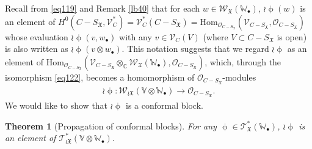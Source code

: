 \documentclass[12pt,a4paper,notitlepage]{report}
\theoremstyle{definition}
\theoremstyle{plain}
\newtheorem{thm}[df]{Theorem}
\newcommand{\fk}{\mathfrak}
\newcommand{\Hom}{\mathrm{Hom}}
\newcommand{\scr}{\mathscr}
\newcommand{\blt}{\bullet}
\newcommand{\Vbb}{\mathbb V}
\newcommand{\Wbb}{\mathbb W}
\newcommand{\Cbb}{\mathbb C}
\numberwithin{equation}{section}
\begin{document}
Recall from \eqref{eq119} and Remark \ref{lb40} that for each $w\in\scr W_{\fk X}(\Wbb_\blt)$, $\wr\upphi(w)$ is an element of $H^0(C-S_{\fk X},\scr V_C^*)=\scr V_C^*(C-S_{\fk X})=\Hom_{\scr O_{C-S_{\fk X}}}(\scr V_{C-S_{\fk X}},\scr O_{C-S_{\fk X}})$ whose evaluation $\wr\upphi(v,w_\blt)$ with any $v\in\scr V_C(V)$ (where $V\subset C-S_{\fk X}$ is open) is also written as $\wr\upphi(v\otimes w_\blt)$. This notation suggests that we regard $\wr\upphi$ as an element of $\Hom_{\scr O_{C-S_{\fk X}}}(\scr V_{C-S_{\fk X}}\otimes_\Cbb\scr W_{\fk X}(\Wbb_\blt),\scr O_{C-S_{\fk X}})$, which, through the isomorphism \eqref{eq122}, becomes a homomorphism of $\scr O_{C-S_{\fk X}}$-modules 
\begin{align*}
\wr\upphi:\scr W_{\wr\fk X}(\Vbb\otimes\Wbb_\blt)\rightarrow\scr O_{C-S_{\fk X}}.
\end{align*}
We would like to show that $\wr\upphi$ is a conformal block.



\begin{thm}[Propagation of conformal blocks]\label{lb126}
For any $\upphi\in\scr T_{\fk X}^*(\Wbb_\blt)$, $\wr\upphi$ is an element of $\scr T_{\wr\fk X}^*(\Vbb\otimes\Wbb_\blt)$. 
\end{thm}
\end{document}
